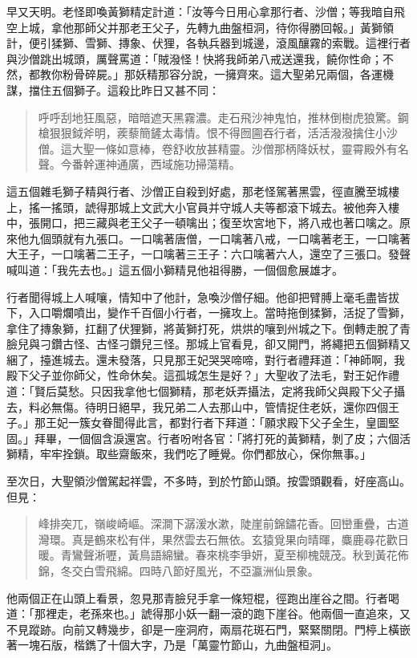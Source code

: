早又天明。老怪即喚黃獅精定計道：「汝等今日用心拿那行者、沙僧；等我暗自飛空上城，拿他那師父并那老王父子，先轉九曲盤桓洞，待你得勝回報。」黃獅領計，便引猱獅、雪獅、摶象、伏狸，各執兵器到城邊，滾風釀霧的索戰。這裡行者與沙僧跳出城頭，厲聲罵道：「賊潑怪！快將我師弟八戒送還我，饒你性命；不然，都教你粉骨碎屍。」那妖精那容分說，一擁齊來。這大聖弟兄兩個，各運機謀，擋住五個獅子。這殺比昨日又甚不同：
\begin{quote}
呼呼刮地狂風惡，暗暗遮天黑霧濃。走石飛沙神鬼怕，推林倒樹虎狼驚。鋼槍狠狠鉞斧明，蒺藜簡鏟太毒情。恨不得囫圇吞行者，活活潑潑擒住小沙僧。這大聖一條如意棒，卷舒收放甚精靈。沙僧那柄降妖杖，靈霄殿外有名聲。今番幹運神通廣，西域施功掃蕩精。
\end{quote}

這五個雜毛獅子精與行者、沙僧正自殺到好處，那老怪駕著黑雲，徑直騰至城樓上，搖一搖頭，諕得那城上文武大小官員并守城人夫等都滾下城去。被他奔入樓中，張開口，把三藏與老王父子一頓噙出；復至坎宮地下，將八戒也著口噙之。原來他九個頭就有九張口。一口噙著唐僧，一口噙著八戒，一口噙著老王，一口噙著大王子，一口噙著二王子，一口噙著三王子：六口噙著六人，還空了三張口。發聲喊叫道：「我先去也。」這五個小獅精見他祖得勝，一個個愈展雄才。

行者聞得城上人喊嚷，情知中了他計，急喚沙僧仔細。他卻把臂膊上毫毛盡皆拔下，入口嚼爛噴出，變作千百個小行者，一擁攻上。當時拖倒猱獅，活捉了雪獅，拿住了摶象獅，扛翻了伏狸獅，將黃獅打死，烘烘的嚷到州城之下。倒轉走脫了青臉兒與刁鑽古怪、古怪刁鑽兒三怪。那城上官看見，卻又開門，將繩把五個獅精又綑了，擡進城去。還未發落，只見那王妃哭哭啼啼，對行者禮拜道：「神師啊，我殿下父子並你師父，性命休矣。這孤城怎生是好？」大聖收了法毛，對王妃作禮道：「賢后莫愁。只因我拿他七個獅精，那老妖弄攝法，定將我師父與殿下父子攝去，料必無傷。待明日絕早，我兄弟二人去那山中，管情捉住老妖，還你四個王子。」那王妃一簇女眷聞得此言，都對行者下拜道：「願求殿下父子全生，皇圖堅固。」拜畢，一個個含淚還宮。行者吩咐各官：「將打死的黃獅精，剝了皮；六個活獅精，牢牢拴鎖。取些齋飯來，我們吃了睡覺。你們都放心，保你無事。」

至次日，大聖領沙僧駕起祥雲，不多時，到於竹節山頭。按雲頭觀看，好座高山。但見：
\begin{quote}
峰排突兀，嶺峻崎嶇。深澗下潺湲水漱，陡崖前錦鏽花香。回巒重疊，古道灣環。真是鶴來松有伴，果然雲去石無依。玄猿覓果向晴暉，麋鹿尋花歡日暖。青鸞聲淅嚦，黃鳥語綿蠻。春來桃李爭妍，夏至柳槐競茂。秋到黃花佈錦，冬交白雪飛綿。四時八節好風光，不亞瀛洲仙景象。
\end{quote}

他兩個正在山頭上看景，忽見那青臉兒手拿一條短棍，徑跑出崖谷之間。行者喝道：「那裡走，老孫來也。」諕得那小妖一翻一滾的跑下崖谷。他兩個一直追來，又不見蹤跡。向前又轉幾步，卻是一座洞府，兩扇花斑石門，緊緊關閉。門楟上橫嵌著一塊石版，楷鐫了十個大字，乃是「萬靈竹節山，九曲盤桓洞」。

